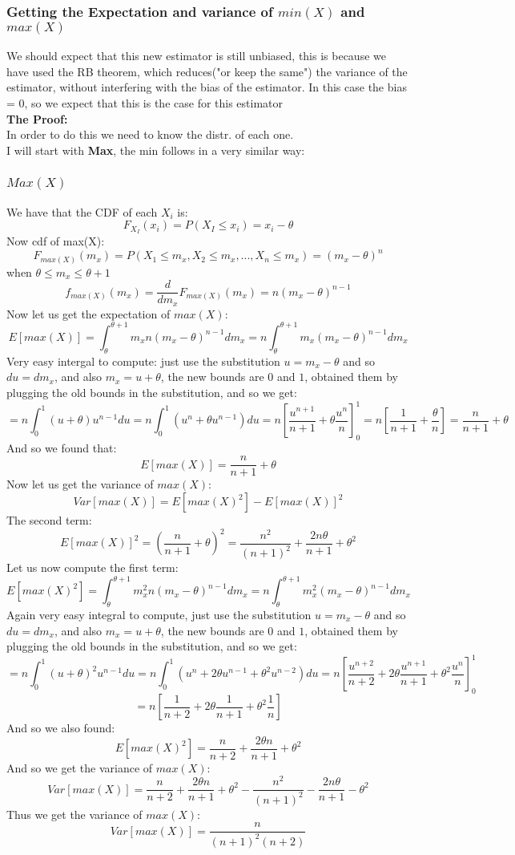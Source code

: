 \documentclass[12pt]{article}
\begin{document}
\subsubsection*{Getting the Expectation and variance of $min(X)$ and $max(X)$}
We should expect that this new estimator is still unbiased, this is because we have used the RB theorem, which reduces("or keep the same") the variance of the estimator, without interfering with the bias of the estimator. In this case the bias = 0, so we expect that this is the case for this estimator\\

\textbf{The Proof:}\\
In order to do this we need to know the distr. of each one. \\ 
I will start with \textbf{Max}, the min follows in a very similar way: 
\\
\subsubsection*{\underline{$Max(X)$}}
We have that the CDF of each $X_i$ is: 
\[
F_{X_I}(x_i) = P(X_I\leq x_i) = x_i-\theta
\]
Now cdf of max(X): 
\[
F_{max(X)}(m_x) = P(X_1\leq m_x, X_2\leq m_x, ..., X_n\leq m_x) = (m_x-\theta)^n
\]
when $\theta \leq m_x \leq \theta +1$
\[
f_{max(X)}(m_x) = \frac{d}{dm_x}F_{max(X)}(m_x) = n(m_x-\theta)^{n-1}
\]
Now let us get the expectation of $max(X)$:
\[
E[max(X)] = \int_{\theta}^{\theta+1}m_xn(m_x-\theta)^{n-1}dm_x = n\int_{\theta}^{\theta+1}m_x(m_x-\theta)^{n-1}dm_x
\]
Very easy intergal to compute: just use the substitution $u = m_x-\theta$ and so $du = dm_x$, and also $m_x = u+\theta$, the new bounds are $0$ and $1$, obtained them by plugging the old bounds in the substitution, and so we get:
\[
= n\int_{0}^{1}(u+\theta)u^{n-1}du = n\int_{0}^{1}(u^{n}+\theta u^{n-1})du = n[\frac{u^{n+1}}{n+1} + \theta\frac{u^n}{n}]_{0}^{1} = n[\frac{1}{n+1} + \frac{\theta}{n}] = \frac{n}{n+1} + \theta
\]
And so we found that: 
\[
E[max(X)] = \frac{n}{n+1} + \theta
\]
Now let us get the variance of $max(X)$:
\[
Var[max(X)] = E[max(X)^2] - E[max(X)]^2
\]
The second term: 
\[
E[max(X)]^2 = (\frac{n}{n+1} + \theta)^2 = \frac{n^2}{(n+1)^2} + \frac{2n\theta}{n+1} + \theta^2
\]
Let us now compute the first term:
\[
E[max(X)^2] = \int_{\theta}^{\theta+1}m_x^2n(m_x-\theta)^{n-1}dm_x = n\int_{\theta}^{\theta+1}m_x^2(m_x-\theta)^{n-1}dm_x
\]
Again very easy integral to compute, just use the substitution $u = m_x-\theta$ and so $du = dm_x$, and also $m_x = u+\theta$, the new bounds are $0$ and $1$, obtained them by plugging the old bounds in the substitution, and so we get:
\[
= n\int_{0}^{1}(u+\theta)^2u^{n-1}du = n\int_{0}^{1}(u^{n}+2\theta u^{n-1} + \theta^2u^{n-2})du = n[\frac{u^{n+2}}{n+2} + 2\theta\frac{u^{n+1}}{n+1} + \theta^2\frac{u^{n}}{n}]_{0}^{1}
\]
\[
= n[\frac{1}{n+2} + 2\theta\frac{1}{n+1} + \theta^2\frac{1}{n}] 
\]
And so we also found:
\[
E[max(X)^2] = \frac{n}{n+2} + \frac{2\theta n}{n+1} + \theta^2
\]
And so we get the variance of $max(X)$:
\[
Var[max(X)] = \frac{n}{n+2} + \frac{2\theta n}{n+1} + \theta^2 - \frac{n^2}{(n+1)^2} - \frac{2n\theta}{n+1} - \theta^2
\]
Thus we get the variance of $max(X)$:
\[
Var[max(X)] = \frac{n}{(n+1)^2(n+2)}
\]
\\
\end{document}
